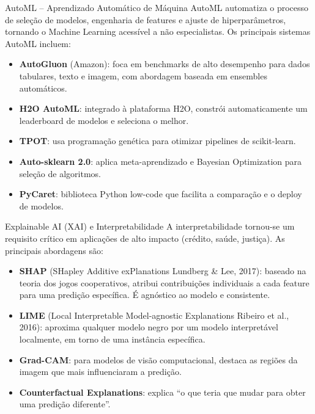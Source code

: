 \documentclass[12pt,a4paper]{article}
\begin{document}
\begin{estadoartebox}{AutoML -- Aprendizado Automático de Máquina}
AutoML automatiza o processo de seleção de modelos, engenharia de features e ajuste de hiperparâmetros, tornando o Machine Learning acessível a não especialistas. Os principais sistemas AutoML incluem:

\begin{itemize}[leftmargin=*]
  \item \textbf{AutoGluon} (Amazon): foca em benchmarks de alto desempenho para dados tabulares, texto e imagem, com abordagem baseada em ensembles automáticos.
  \item \textbf{H2O AutoML}: integrado à plataforma H2O, constrói automaticamente um leaderboard de modelos e seleciona o melhor.
  \item \textbf{TPOT}: usa programação genética para otimizar pipelines de scikit-learn.
  \item \textbf{Auto-sklearn 2.0}: aplica meta-aprendizado e Bayesian Optimization para seleção de algoritmos.
  \item \textbf{PyCaret}: biblioteca Python low-code que facilita a comparação e o deploy de modelos.
\end{itemize}
\end{estadoartebox}

\begin{estadoartebox}{Explainable AI (XAI) e Interpretabilidade}
A interpretabilidade tornou-se um requisito crítico em aplicações de alto impacto (crédito, saúde, justiça). As principais abordagens são:

\begin{itemize}[leftmargin=*]
  \item \textbf{SHAP} (SHapley Additive exPlanations Lundberg \& Lee, 2017): baseado na teoria dos jogos cooperativos, atribui contribuições individuais a cada feature para uma predição específica. É agnóstico ao modelo e consistente.
  \item \textbf{LIME} (Local Interpretable Model-agnostic Explanations Ribeiro et al., 2016): aproxima qualquer modelo negro por um modelo interpretável localmente, em torno de uma instância específica.
  \item \textbf{Grad-CAM}: para modelos de visão computacional, destaca as regiões da imagem que mais influenciaram a predição.
  \item \textbf{Counterfactual Explanations}: explica ``o que teria que mudar para obter uma predição diferente''.
\end{itemize}
\end{estadoartebox}
\end{document}
